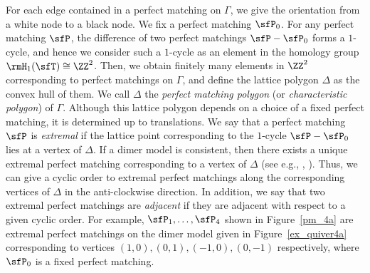For each edge contained in a perfect matching on $\Gamma$, we give the orientation from a white node to a black node. We fix a perfect matching $\sfP_0$. For any perfect matching $\sfP$, the difference of two perfect matchings $\sfP-\sfP_0$ forms a $1$-cycle, and hence we consider such a $1$-cycle as an element in the homology group $\rmH_1(\sfT)\cong\ZZ^2$. Then, we obtain finitely many elements in $\ZZ^2$ corresponding to perfect matchings on $\Gamma$, and define the lattice polygon $\Delta$ as the convex hull of them. We call $\Delta$ the \emph{perfect matching polygon} (or \emph{characteristic polygon}) of $\Gamma$. Although this lattice polygon depends on a choice of a fixed perfect matching, it is determined up to translations. We say that a perfect matching $\sfP$ is \emph{extremal} if the lattice point corresponding to the $1$-cycle $\sfP-\sfP_0$ lies at a vertex of $\Delta$. If a dimer model is consistent, then there exists a unique extremal perfect matching corresponding to a vertex of $\Delta$ (see e.g., \cite[Corollary~4.27]{Bro}, \cite[Proposition~9.2]{IU2}). Thus, we can give a cyclic order to extremal perfect matchings along the corresponding vertices of $\Delta$ in the anti-clockwise direction. In addition, we say that two extremal perfect matchings are \emph{adjacent} if they are adjacent with respect to a given cyclic order. For example, $\sfP_1,\dots,\sfP_4$ shown in Figure~\ref{pm_4a} are extremal perfect matchings on the dimer model given in Figure~\ref{ex_quiver4a} corresponding to vertices $(1,0),(0,1),(-1,0),(0,-1)$ respectively, where $\sfP_0$ is a fixed perfect matching.

